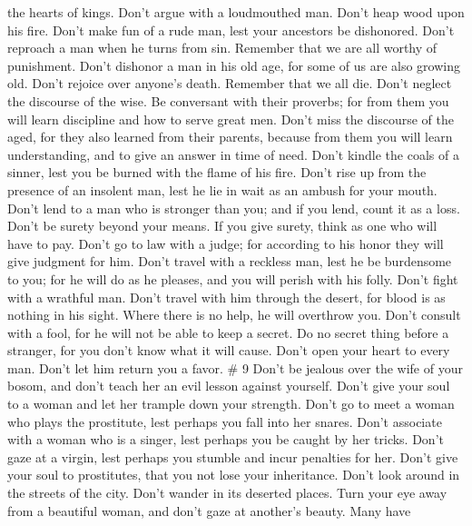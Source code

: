 the hearts of kings.  Don't argue with a loudmouthed man.
Don't heap wood upon his fire.  Don't make fun of a rude
man, lest your ancestors be dishonored.  Don't reproach a
man when he turns from sin. Remember that we are all worthy of
punishment.  Don't dishonor a man in his old age, for some
of us are also growing old.  Don't rejoice over anyone's
death. Remember that we all die.  Don't neglect the
discourse of the wise. Be conversant with their proverbs; for from them
you will learn discipline and how to serve great men.  Don't
miss the discourse of the aged, for they also learned from their
parents, because from them you will learn understanding, and to give an
answer in time of need.  Don't kindle the coals of a
sinner, lest you be burned with the flame of his fire. 
Don't rise up from the presence of an insolent man, lest he lie in wait
as an ambush for your mouth.  Don't lend to a man who is
stronger than you; and if you lend, count it as a loss. 
Don't be surety beyond your means. If you give surety, think as one who
will have to pay.  Don't go to law with a judge; for
according to his honor they will give judgment for him. 
Don't travel with a reckless man, lest he be burdensome to you; for he
will do as he pleases, and you will perish with his folly. 
Don't fight with a wrathful man. Don't travel with him through the
desert, for blood is as nothing in his sight. Where there is no help, he
will overthrow you.  Don't consult with a fool, for he will
not be able to keep a secret.  Do no secret thing before a
stranger, for you don't know what it will cause.  Don't
open your heart to every man. Don't let him return you a favor. \# 9
 Don't be jealous over the wife of your bosom, and don't
teach her an evil lesson against yourself.  Don't give your
soul to a woman and let her trample down your strength. 
Don't go to meet a woman who plays the prostitute, lest perhaps you fall
into her snares.  Don't associate with a woman who is a
singer, lest perhaps you be caught by her tricks.  Don't
gaze at a virgin, lest perhaps you stumble and incur penalties for her.
 Don't give your soul to prostitutes, that you not lose your
inheritance.  Don't look around in the streets of the city.
Don't wander in its deserted places.  Turn your eye away
from a beautiful woman, and don't gaze at another's beauty. Many have
